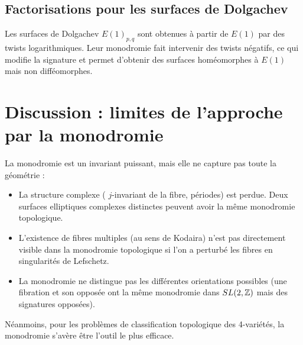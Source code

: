 \subsection{Factorisations pour les surfaces de Dolgachev}

Les surfaces de Dolgachev $E(1)_{p,q}$ sont obtenues à partir de $E(1)$ par des twists logarithmiques. Leur monodromie fait intervenir des twists négatifs, ce qui modifie la signature et permet d'obtenir des surfaces homéomorphes à $E(1)$ mais non difféomorphes.

\section{Discussion : limites de l'approche par la monodromie}

La monodromie est un invariant puissant, mais elle ne capture pas toute la géométrie :

\begin{itemize}
\item La structure complexe ( $j$-invariant de la fibre, périodes) est perdue. Deux surfaces elliptiques complexes distinctes peuvent avoir la même monodromie topologique.
\item L'existence de fibres multiples (au sens de Kodaira) n'est pas directement visible dans la monodromie topologique si l'on a perturbé les fibres en singularités de Lefschetz.
\item La monodromie ne distingue pas les différentes orientations possibles (une fibration et son opposée ont la même monodromie dans $SL(2,\mathbb{Z})$ mais des signatures opposées).
\end{itemize}
Néanmoins, pour les problèmes de classification topologique des 4-variétés, la monodromie s'avère être l'outil le plus efficace.

